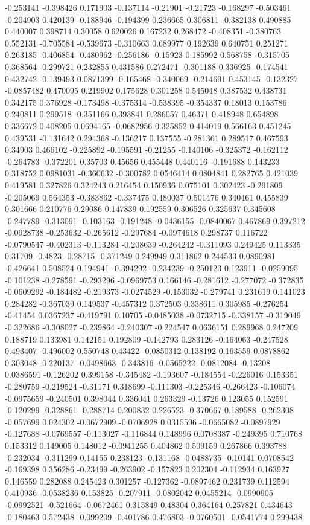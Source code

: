-0.253141 -0.398426 0.171903 -0.137114 -0.21901 -0.21723 -0.168297 -0.503461 -0.204903 0.420139 -0.188946 -0.194399 0.236665 0.306811 -0.382138 0.490885 0.440007 0.398714 0.30058 0.620026 0.167232 0.268472 -0.408351 -0.380763 0.552131 -0.705584 -0.539673 -0.310663 0.689977 0.192639 0.640751 0.251271 0.263185 -0.406854 -0.480962 -0.256186 -0.15923 0.185992 0.568758 -0.315705 0.368564 -0.299721 0.232855 0.431586 0.272471 -0.301188 0.336925 -0.174541 0.432742 -0.139493 0.0871399 -0.165468 -0.340069 -0.214691 0.453145 -0.132327 -0.0857482 0.470095 0.219902 0.175628 0.301258 0.545048 0.387532 0.438731 0.342175 0.376928 -0.173498 -0.375314 -0.538395 -0.354337 0.18013 0.153786 0.240811 0.299518 -0.351166 0.393841 0.286057 0.46371 0.418948 0.654898 0.336672 0.408205 0.0694165 -0.0682956 0.325852 0.414019 0.566163 0.451245 0.439531 -0.131642 0.294368 -0.136217 0.137555 -0.281361 0.289517 0.467593 0.34903 0.466102 -0.225892 -0.195591 -0.21255 -0.140106 -0.325372 -0.162112 -0.264783 -0.372201 0.35703 0.45656 0.455448 0.440116 -0.191688 0.143233 0.318752 0.0981031 -0.360632 -0.300782 0.0546414 0.0804841 0.282765 0.421039 0.419581 0.327826 0.324243 0.216454 0.150936 0.075101 0.302423 -0.291809 -0.205069 0.564353 -0.383862 -0.337475 0.480037 0.501476 0.340461 0.455839 0.301666 0.210776 0.29086 0.147839 0.192559 0.306526 0.325637 0.345608 -0.247789 -0.313091 -0.103163 -0.191248 -0.0436155 -0.0840067 0.467869 0.397212 -0.0928738 -0.253632 -0.265612 -0.297684 -0.0974618 0.298737 0.116722 -0.0790547 -0.402313 -0.113284 -0.208639 -0.264242 -0.311093 0.249425 0.113335 0.31709 -0.4823 -0.28715 -0.371249 0.249949 0.311862 0.244533 0.0890981 -0.426641 0.508524 0.194941 -0.394292 -0.234239 -0.250123 0.123911 -0.0259095 -0.101238 -0.278591 -0.293296 -0.0969753 0.166146 -0.281612 -0.277072 -0.372835 -0.0609292 -0.184482 -0.219373 -0.0274529 -0.153032 -0.279741 0.231619 0.141023 0.284282 -0.367039 0.149537 -0.457312 0.372503 0.338611 0.305985 -0.276254 -0.41454 0.0367237 -0.419791 0.10705 -0.0485038 -0.0732715 -0.338157 -0.319049 -0.322686 -0.308027 -0.239864 -0.240307 -0.224547 0.0636151 0.289968 0.247209 0.188719 0.133981 0.142151 0.192809 -0.142793 0.283126 -0.164063 -0.247528 0.493407 -0.496002 0.550748 0.43422 -0.0850312 0.138192 0.163559 0.0878862 0.303048 -0.220137 -0.0498663 -0.343816 -0.0565222 -0.0812084 -0.13208 0.0386591 -0.126202 0.399158 -0.345482 -0.193607 -0.184554 -0.226016 0.153351 -0.280759 -0.219524 -0.31171 0.318699 -0.111303 -0.225346 -0.266423 -0.106074 -0.0975659 -0.240501 0.398044 0.336041 0.263329 -0.13726 0.123055 0.152591 -0.120299 -0.328861 -0.288714 0.200832 0.226523 -0.370667 0.189588 -0.262308 -0.057699 0.024302 -0.0672909 -0.0706928 0.0315596 -0.0665082 -0.0897929 -0.127688 -0.0769557 -0.113027 -0.116844 0.148996 0.0708387 -0.249395 0.710768 0.153312 0.149005 0.148012 -0.0941255 0.404862 0.509159 0.267866 0.393788 -0.232034 -0.311299 0.14155 0.238123 -0.131168 -0.0488735 -0.10141 0.0708542 -0.169398 0.356286 -0.23499 -0.263902 -0.157823 0.202304 -0.112934 0.163927 0.146559 0.282088 0.245423 0.301257 -0.127362 -0.0897462 0.231739 0.112594 0.410936 -0.0538236 0.153825 -0.207911 -0.0802042 0.0455214 -0.0990905 -0.0992521 -0.521664 -0.0672461 0.315849 0.48304 0.364164 0.257821 0.434643 -0.180463 0.572438 -0.099209 -0.401786 0.476803 -0.0760501 -0.0541774 0.299438 